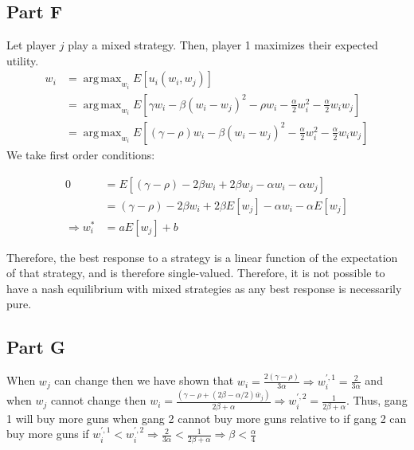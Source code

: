 \documentclass[11pt]{article} %
\DeclareMathOperator*{\argmax}{arg\,max}
\begin{document}
\subsection{Part F}
Let player $j$ play a mixed strategy. Then, player 1 maximizes their expected utility.
\begin{align*}
w_i &= \argmax_{w_i} E[u_i(w_i,w_j)] \\
&=  \argmax_{w_i} E[\gamma w_i - \beta(w_i - w_j)^2 - \rho w_i - \frac{\alpha}{2}w_i^2 -\frac{\alpha}{2}w_iw_j ]\\
&= \argmax_{w_i} E[(\gamma - \rho) w_i - \beta(w_i - w_j)^2  - \frac{\alpha}{2}w_i^2 -\frac{\alpha}{2}w_iw_j ]
\end{align*}
We take first order conditions:

\begin{align*}
0&= E[(\gamma - \rho) - 2\beta w_i + 2\beta w_j - \alpha w_i - \alpha w_j]\\
&= (\gamma - \rho) - 2\beta w_i +2\beta E[w_j] - \alpha w_i - \alpha E[w_j]\\
\Rightarrow w_i^{*}&= aE[w_j] +b
\end{align*}

Therefore, the best response to a strategy is a linear function of the expectation of that strategy, and is therefore single-valued. Therefore, it is not possible to have a nash equilibrium with mixed strategies as any best response is necessarily pure.
\subsection{Part G}
When $w_j$ can change then we have shown that $w_i = \frac{2(\gamma - \rho)}{3\alpha} \Rightarrow w_i^{',1} = \frac{2}{3\alpha}$ and when $w_j$ cannot change then $w_i = \frac{(\gamma - \rho + (2\beta - \alpha/2) \bar{w}_j)}{2\beta + \alpha} \Rightarrow w_i^{',2} = \frac{1}{2\beta + \alpha}$. Thus, gang 1 will buy more guns when gang 2 cannot buy more guns relative to if gang 2 can buy more guns if $w_{i}^{',1}<w_{i}^{',2} \Rightarrow  \frac{2}{3\alpha}< \frac{1}{2\beta + \alpha} \Rightarrow \beta < \frac{\alpha}{4}$
\end{document}
